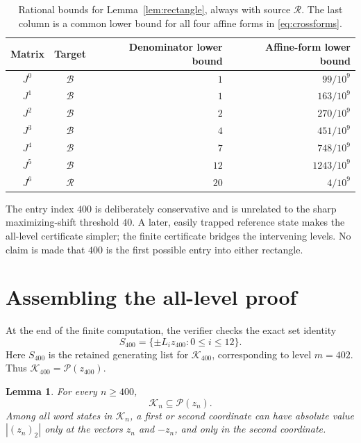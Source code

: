 \documentclass[11pt,a4paper]{article}
\newtheorem{lemma}[theorem]{Lemma}
\theoremstyle{definition}\newtheorem{definition}[theorem]{Definition}
\theoremstyle{remark}\newtheorem{remark}[theorem]{Remark}
\newcommand{\cB}{\mathcal B}
\newcommand{\cR}{\mathcal R}
\newcommand{\cP}{\mathcal P}
\newcommand{\cK}{\mathcal K}
\begin{document}
\begin{table}[htbp]
\centering
\caption{Rational bounds for Lemma~\ref{lem:rectangle}, always with source
$\cR$. The last column is a common lower bound for all four affine forms
in \eqref{eq:crossforms}.}
\label{tab:boxes}
\begin{tabular}{ccrr}
\toprule
Matrix & Target & Denominator lower bound & Affine-form lower bound\\
\midrule
$J^0$&$\cB$&$1$&$99/10^9$\\
$J^1$&$\cB$&$1$&$163/10^9$\\
$J^2$&$\cB$&$2$&$270/10^9$\\
$J^3$&$\cB$&$4$&$451/10^9$\\
$J^4$&$\cB$&$7$&$748/10^9$\\
$J^5$&$\cB$&$12$&$1243/10^9$\\
$J^6$&$\cR$&$20$&$4/10^9$\\
\bottomrule
\end{tabular}
\end{table}

The entry index $400$ is deliberately conservative and is unrelated to the
sharp maximizing-shift threshold $40$. A later, easily trapped reference
state makes the all-level certificate simpler; the finite certificate bridges
the intervening levels. No claim is made that $400$ is the first possible
entry into either rectangle.

\section{Assembling the all-level proof}
\label{sec:assembly}

At the end of the finite computation, the verifier checks the exact set
identity
\begin{equation}
 S_{400}=\{\pm L_i z_{400}:0\le i\le12\}.
 \label{eq:entry-hull}
\end{equation}
Here $S_{400}$ is the retained generating list for $\cK_{400}$, corresponding
to level $m=402$. Thus $\cK_{400}=\cP(z_{400})$.

\begin{lemma}
\label{lem:all-hulls}
For every $n\ge400$,
\begin{equation}
 \cK_n\subseteq\cP(z_n).
 \label{eq:all-hulls}
\end{equation}
Among all word states in $\cK_n$, a first or second coordinate can have
absolute value $|(z_n)_2|$ only at the vectors $z_n$ and $-z_n$, and only
in the second coordinate.
\end{lemma}
\end{document}
